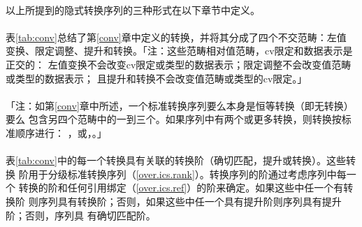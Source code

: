 \paragraph{}
以上所提到的隐式转换序列的三种形式在以下章节中定义。

\paragraph{}
表\ref{tab:conv}总结了第\ref{conv}章中定义的转换，并将其分成了四个不交范畴：左值
变换、限定调整、提升和转换。「注：这些范畴相对值范畴，cv限定和数据表示是正交的：
左值变换不会改变cv限定或类型的数据表示；限定调整不会改变值范畴或类型的数据表示；
且提升和转换不会改变值范畴或类型的cv限定。」

\paragraph{}
「注：如第\ref{conv}章中所述，一个标准转换序列要么本身是恒等转换（即无转换）要么
包含另四个范畴中的一到三个。如果序列中有两个或更多转换，则转换按标准顺序进行：
，或，。」

\paragraph{}
表\ref{tab:conv}中的每一个转换具有关联的转换阶（确切匹配，提升或转换）。这些转换
阶用于分级标准转换序列（\ref{over.ics.rank}）。转换序列的阶通过考虑序列中每一个
转换的阶和任何引用绑定（\ref{over.ics.ref}）的阶来确定。如果这些中任一个有转换阶
则序列具有转换阶；否则，如果这些中任一个具有提升阶则序列具有提升阶；否则，序列具
有确切匹配阶。

